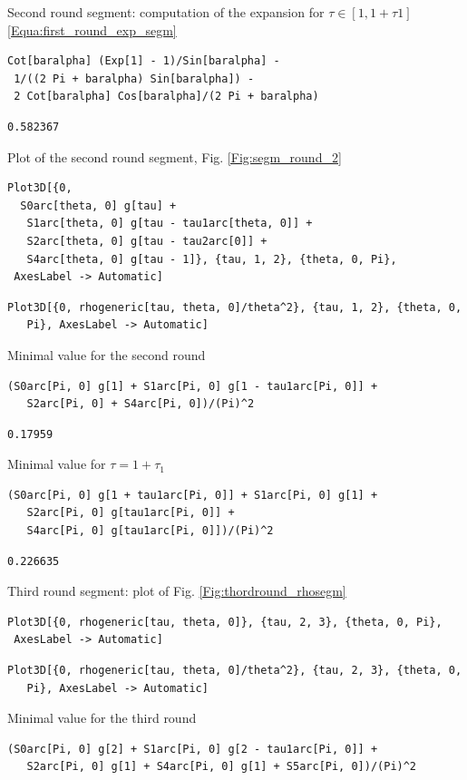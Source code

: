 \documentclass[reqno]{amsart}
\theoremstyle{definition} \newtheorem{definition}{Definition}[section]
\theoremstyle{definition} \newtheorem{remark}[definition]{Remark}
\theoremstyle{plain} \newtheorem{lemma}[definition]{Lemma}
\theoremstyle{plain} \newtheorem{proposition}[definition]{Proposition}
\theoremstyle{plain} \newtheorem{theorem}[definition]{Theorem}
\theoremstyle{plain} \newtheorem{corollary}[definition]{Corollary}
\theoremstyle{definition} \newtheorem{example}[definition]{Example}
\theoremstyle{plain} \newtheorem{claim}[clai]{Claim}
\theoremstyle{definition} \newtheorem{assumption}[definition]{Assumption}
\theoremstyle{definition} \newtheorem{observation}[definition]{Observation}
\newcommand{\1}{\mathbbm 1}
\numberwithin{equation}{section} %
\theoremstyle{plain} \newtheorem*{theorem*}{Theorem}
\theoremstyle{plain} \newtheorem{mthm}[maintheorem]{Main Theorem}
\theoremstyle{plain} \newtheorem*{mthm*}{Main Theorem}
\theoremstyle{plain} \newtheorem*{conjecture*}{Conjecture}
\theoremstyle{plain} \newtheorem{conjecture}[definition]{Conjecture}
\theoremstyle{plain} \newtheorem*{problem*}{Problem}
\begin{document}
\medskip
Second round segment: computation of the expansion for $\tau \in [1,1+\tau1]$ \eqref{Equa:first_round_exp_segm}
\medskip
\begin{verbatim}
Cot[baralpha] (Exp[1] - 1)/Sin[baralpha] - 
 1/((2 Pi + baralpha) Sin[baralpha]) - 
 2 Cot[baralpha] Cos[baralpha]/(2 Pi + baralpha)
\end{verbatim}
\begin{verbatim}
0.582367
\end{verbatim}
\medskip
Plot of the second round segment, Fig. \ref{Fig:segm_round_2}
\medskip
\begin{verbatim}
Plot3D[{0, 
  S0arc[theta, 0] g[tau] + 
   S1arc[theta, 0] g[tau - tau1arc[theta, 0]] + 
   S2arc[theta, 0] g[tau - tau2arc[0]] + 
   S4arc[theta, 0] g[tau - 1]}, {tau, 1, 2}, {theta, 0, Pi}, 
 AxesLabel -> Automatic]
\end{verbatim}
\begin{verbatim}
Plot3D[{0, rhogeneric[tau, theta, 0]/theta^2}, {tau, 1, 2}, {theta, 0,
   Pi}, AxesLabel -> Automatic]
\end{verbatim}
\medskip
Minimal value for the second round
\medskip
\begin{verbatim}
(S0arc[Pi, 0] g[1] + S1arc[Pi, 0] g[1 - tau1arc[Pi, 0]] + 
   S2arc[Pi, 0] + S4arc[Pi, 0])/(Pi)^2
\end{verbatim}
\begin{verbatim}
0.17959
\end{verbatim}
\medskip
Minimal value for $\tau = 1+\tau_1$
\medskip
\begin{verbatim}
(S0arc[Pi, 0] g[1 + tau1arc[Pi, 0]] + S1arc[Pi, 0] g[1] + 
   S2arc[Pi, 0] g[tau1arc[Pi, 0]] + 
   S4arc[Pi, 0] g[tau1arc[Pi, 0]])/(Pi)^2
\end{verbatim}
\begin{verbatim}
0.226635
\end{verbatim}
\medskip
Third round segment: plot of Fig. \ref{Fig:thordround_rhosegm}
\medskip
\begin{verbatim}
Plot3D[{0, rhogeneric[tau, theta, 0]}, {tau, 2, 3}, {theta, 0, Pi}, 
 AxesLabel -> Automatic]
\end{verbatim}
\begin{verbatim}
Plot3D[{0, rhogeneric[tau, theta, 0]/theta^2}, {tau, 2, 3}, {theta, 0,
   Pi}, AxesLabel -> Automatic]
\end{verbatim}
\medskip
Minimal value for the third round
\medskip
\begin{verbatim}
(S0arc[Pi, 0] g[2] + S1arc[Pi, 0] g[2 - tau1arc[Pi, 0]] + 
   S2arc[Pi, 0] g[1] + S4arc[Pi, 0] g[1] + S5arc[Pi, 0])/(Pi)^2
\end{verbatim}
\end{document}
